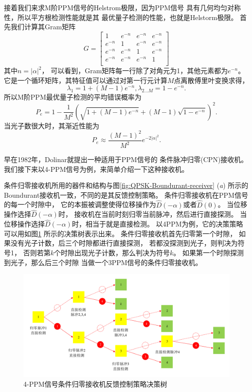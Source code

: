 接着我们来求M阶PPM信号的Helstrom极限，因为PPM信号
具有几何均匀对称性，所以平方根检测性能就是其
最优量子检测的性能，也就是Helstorm极限。
首先我们计算其Gram矩阵
\begin{equation}
G = \left[
\begin{array}{cccc}
 1 & e^{-n} & e^{-n} & e^{-n} \\
 e^{-n} & 1 & e^{-n} & e^{-n} \\
 e^{-n} & e^{-n} & 1 & e^{-n} \\
 e^{-n} & e^{-n} & e^{-n} & 1 \\
\end{array}
\right]
\end{equation}
其中$n=|\alpha|^2$，
可以看到，Gram矩阵每一行除了对角元为1，其他元素都为$e^{-n}$。
它是一个循环矩阵，其特征值可以通过对第一行元计算$M$点离散傅里叶变换求得\cite{zxd2004matrix}，
\begin{equation}
\lambda_1 = 1 + (M-1)e^{-n}, \lambda_{2...M} = 1-e^{-n}.
\end{equation}
所以M阶PPM最优量子检测的平均错误概率为
\begin{equation}
P_e = 1 - \frac{1}{M^2}(\sqrt{1 + (M-1)e^{-n}} + (M-1)\sqrt{1-e^{-n}})^2.
\end{equation}
当光子数很大时，其渐近性能为
\begin{equation}
P_e \approx \frac{(M-1)^2}{M^2} e^{-2|\alpha|^2}.
\end{equation}

早在1982年，Dolinar就提出一种适用于PPM信号的
条件脉冲归零(CPN)接收机\cite{dolinar1982near}。
我们接下来以4-PPM信号为例，来简单介绍一下这种接收机。

条件归零接收机所用的器件和结构与图\ref{fig:QPSK-Boundurant-receiver} (\textit{a})
所示的Boundurant接收机一致，不同的是其反馈控制策略。
条件归零接收机在PPM信号的每一个时隙中，
它的本振被调整使得位移操作为$\hat{D}(-\alpha)$或者$\hat{D}(0)$。
当位移操作选择$\hat{D}(-\alpha)$时，
接收机在当前时刻归零当前脉冲，然后进行直接探测。
当位移操作选择$\hat{D}(-\alpha)$时，相当于就是直接检测。
以4PPM为例，它的决策策略可以用如图\ref{fig:CPN-Decision-Tree}
所示的决策树表示出来。
条件归零接收机首先归零第一个时隙，
如果没有光子计数，后三个时隙都进行直接探测，
若都没探测到光子，则判决为符号1，
否则若第$k$个时隙出现光子计数，那么判决为符号$k$。
如果第一个时隙探测到光子，那么后三个时隙
当做一个3PPM信号的条件归零接收机。

\begin{figure}
\centering
  \includegraphics[width=\textwidth]{figures/chap2/CPN-Decision-Tree}
  \caption{4-PPM信号条件归零接收机反馈控制策略决策树}
  \label{fig:CPN-Decision-Tree}
\end{figure}

